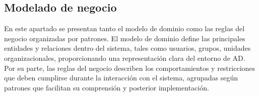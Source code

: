 \subsection{Modelado de negocio}

En este apartado se presentan tanto el modelo de dominio como las reglas del negocio organizadas por patrones. El modelo de dominio define las principales entidades y relaciones dentro del sistema, tales como usuarios, grupos, unidades organizacionales, proporcionando una representación clara del entorno de AD. Por su parte, las reglas del negocio describen los comportamientos y restricciones que deben cumplirse durante la interacción con el sistema, agrupadas según patrones que facilitan su comprensión y posterior implementación.




